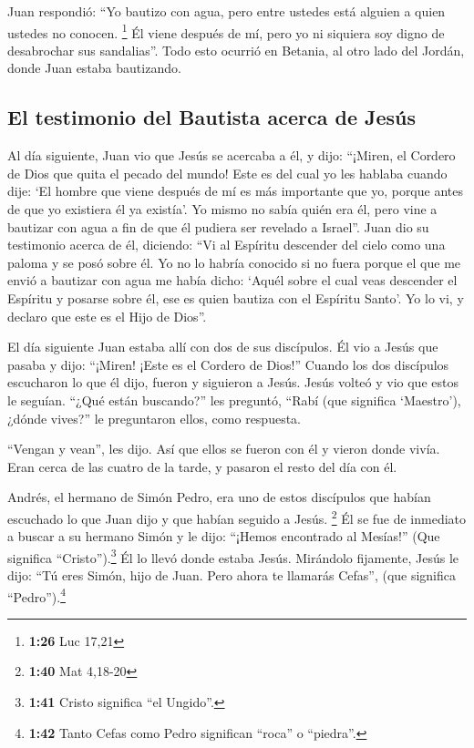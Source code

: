  Juan respondió: ``Yo bautizo con agua, pero entre
ustedes está alguien a quien ustedes no conocen. \footnote{\textbf{1:26}
  Luc 17,21}  Él viene después de mí, pero yo ni siquiera
soy digno de desabrochar sus sandalias''.  Todo esto
ocurrió en Betania, al otro lado del Jordán, donde Juan estaba
bautizando.

\hypertarget{el-testimonio-del-bautista-acerca-de-jesuxfas}{%
\subsection{El testimonio del Bautista acerca de
Jesús}\label{el-testimonio-del-bautista-acerca-de-jesuxfas}}

 Al día siguiente, Juan vio que Jesús se acercaba a él, y
dijo: ``¡Miren, el Cordero de Dios que quita el pecado del mundo!
 Este es del cual yo les hablaba cuando dije: `El hombre
que viene después de mí es más importante que yo, porque antes de que yo
existiera él ya existía'.  Yo mismo no sabía quién era
él, pero vine a bautizar con agua a fin de que él pudiera ser revelado a
Israel''.  Juan dio su testimonio acerca de él, diciendo:
``Vi al Espíritu descender del cielo como una paloma y se posó sobre él.
 Yo no lo habría conocido si no fuera porque el que me
envió a bautizar con agua me había dicho: `Aquél sobre el cual veas
descender el Espíritu y posarse sobre él, ese es quien bautiza con el
Espíritu Santo'.  Yo lo vi, y declaro que este es el Hijo
de Dios''.

 El día siguiente Juan estaba allí con dos de sus
discípulos.  Él vio a Jesús que pasaba y dijo: ``¡Miren!
¡Este es el Cordero de Dios!''  Cuando los dos discípulos
escucharon lo que él dijo, fueron y siguieron a Jesús. 
Jesús volteó y vio que estos le seguían. ``¿Qué están buscando?'' les
preguntó, ``Rabí (que significa `Maestro'), ¿dónde vives?'' le
preguntaron ellos, como respuesta.

 ``Vengan y vean'', les dijo. Así que ellos se fueron con
él y vieron donde vivía. Eran cerca de las cuatro de la tarde, y pasaron
el resto del día con él.

 Andrés, el hermano de Simón Pedro, era uno de estos
discípulos que habían escuchado lo que Juan dijo y que habían seguido a
Jesús. \footnote{\textbf{1:40} Mat 4,18-20}  Él se fue de
inmediato a buscar a su hermano Simón y le dijo: ``¡Hemos encontrado al
Mesías!'' (Que significa ``Cristo'').\footnote{\textbf{1:41} Cristo
  significa ``el Ungido''.}  Él lo llevó donde estaba
Jesús. Mirándolo fijamente, Jesús le dijo: ``Tú eres Simón, hijo de
Juan. Pero ahora te llamarás Cefas'', (que significa
``Pedro'').\footnote{\textbf{1:42} Tanto Cefas como Pedro significan
  ``roca'' o ``piedra''.}

